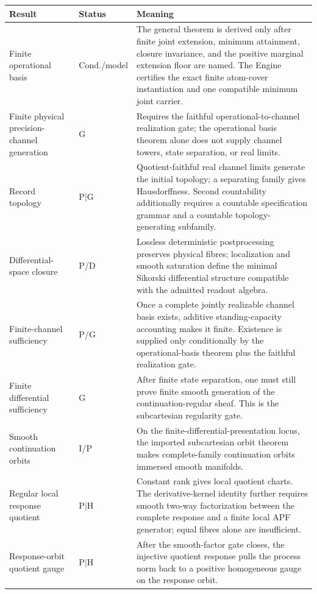 \documentclass[11pt]{article}
\theoremstyle{remark}
\newcommand{\Status}[1]{\textsf{#1}}
\begin{document}
\begin{longtable}{p{}p{}p{}}
\toprule
Result & Status & Meaning \\
\midrule
Finite operational basis & \Status{Cond./model} & The general theorem is derived only after finite joint extension, minimum attainment, closure invariance, and the positive marginal extension floor are named.  The Engine certifies the exact finite atom-cover instantiation and one compatible minimum joint carrier. \\
Finite physical precision-channel generation & \Status{G} & Requires the faithful operational-to-channel realization gate; the operational basis theorem alone does not supply channel towers, state separation, or real limits. \\
Record topology & \Status{P$\mid$G} & Quotient-faithful real channel limits generate the initial topology; a separating family gives Hausdorffness.  Second countability additionally requires a countable specification grammar and a countable topology-generating subfamily. \\
Differential-space closure & \Status{P/D} & Lossless deterministic postprocessing preserves physical fibres; localization and smooth saturation define the minimal Sikorski differential structure compatible with the admitted readout algebra. \\
Finite-channel sufficiency & \Status{P/G} & Once a complete jointly realizable channel basis exists, additive standing-capacity accounting makes it finite.  Existence is supplied only conditionally by the operational-basis theorem plus the faithful realization gate. \\
Finite differential sufficiency & \Status{G} & After finite state separation, one must still prove finite smooth generation of the continuation-regular sheaf.  This is the subcartesian regularity gate. \\
Smooth continuation orbits & \Status{I/P} & On the finite-differential-presentation locus, the imported subcartesian orbit theorem makes complete-family continuation orbits immersed smooth manifolds. \\
Regular local response quotient & \Status{P$\mid$H} & Constant rank gives local quotient charts.  The derivative-kernel identity further requires smooth two-way factorization between the complete response and a finite local APF generator; equal fibres alone are insufficient. \\
Response-orbit quotient gauge & \Status{P$\mid$H} & After the smooth-factor gate closes, the injective quotient response pulls the process norm back to a positive homogeneous gauge on the response orbit. \\

\end{longtable}
\end{document}
